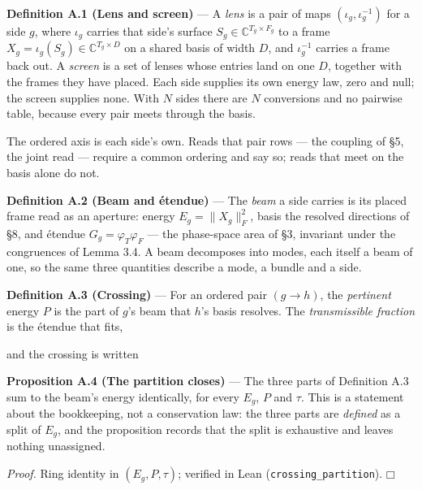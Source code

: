 \documentclass[10pt,letterpaper,twocolumn]{article}
\providecommand{\square}{\mdlgwhtsquare}\providecommand{\Box}{\mdlgwhtsquare}%
\begin{document}
\textbf{Definition A.1 (Lens and screen)} --- A \emph{lens} is a pair of maps \((\iota_g,\iota_g^{-1})\) for a side \(g\), where \(\iota_g\) carries that side's surface \(S_g\in\mathbb{C}^{T_g\times F_g}\) to a frame \(X_g=\iota_g(S_g)\in\mathbb{C}^{T_g\times D}\) on a shared basis of width \(D\), and \(\iota_g^{-1}\) carries a frame back out. A \emph{screen} is a set of lenses whose entries land on one \(D\), together with the frames they have placed. Each side supplies its own energy law, zero and null; the screen supplies none. With \(N\) sides there are \(N\) conversions and no pairwise table, because every pair meets through the basis.

The ordered axis is each side's own. Reads that pair rows --- the coupling of §5, the joint read --- require a common ordering and say so; reads that meet on the basis alone do not.

\textbf{Definition A.2 (Beam and étendue)} --- The \emph{beam} a side carries is its placed frame read as an aperture: energy \(E_g=\lVert X_g\rVert_F^2\), basis the resolved directions of §8, and étendue \(G_g=\varphi_T\varphi_F\) --- the phase-space area of §3, invariant under the congruences of Lemma 3.4. A beam decomposes into modes, each itself a beam of one, so the same three quantities describe a mode, a bundle and a side.

\textbf{Definition A.3 (Crossing)} --- For an ordered pair \((g\to h)\), the \emph{pertinent} energy \(P\) is the part of \(g\)'s beam that \(h\)'s basis resolves. The \emph{transmissible fraction} is the étendue that fits,


and the crossing is written


\textbf{Proposition A.4 (The partition closes)} --- The three parts of Definition A.3 sum to the beam's energy identically, for every \(E_g\), \(P\) and \(\tau\). This is a statement about the bookkeeping, not a conservation law: the three parts are \emph{defined} as a split of \(E_g\), and the proposition records that the split is exhaustive and leaves nothing unassigned.

\emph{Proof.} Ring identity in \((E_g,P,\tau)\); verified in Lean (\texttt{crossing\_\allowbreak{}partition}). \(\square\)
\end{document}
